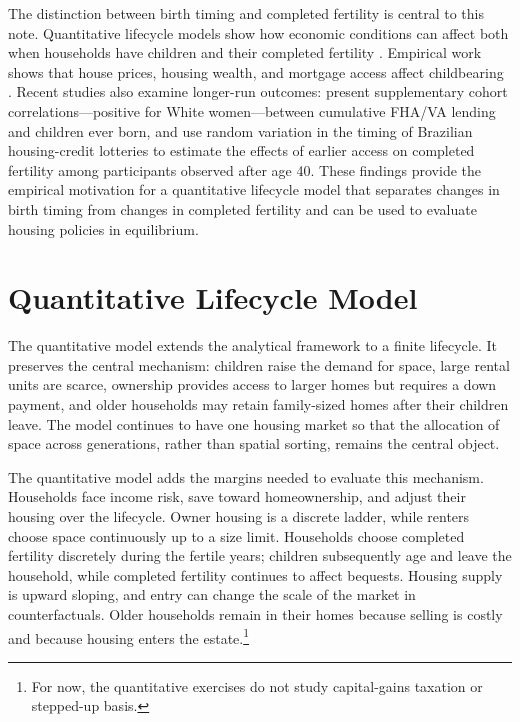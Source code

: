 \documentclass[11pt]{article}
\theoremstyle{definition}
\newcommand{\1}{\mathbf 1}
\begin{document}
The distinction between birth timing and completed fertility is central to
this note. Quantitative lifecycle models show how economic conditions can
affect both when households have children and their completed fertility
\citep{sommerFertilityChoiceLife2016,doepkeBargainingBabiesTheory2019}.
Empirical work shows that house prices, housing wealth, and mortgage access
affect childbearing
\citep{lovenheimFamilyWealthShocks2013,dettlingHousePricesBirth2014,hacamoBabiesMortgageDeregulation2021}.
Recent studies also examine longer-run outcomes: \citet{dettlingKearneyModernMortgage2025}
present supplementary cohort correlations---positive for White women---between
cumulative FHA/VA lending and children ever born, and
\citet{vandoornikFazioRamadoraiSkrastinsHousingFertility2025} use random
variation in the timing of Brazilian housing-credit lotteries to estimate the
effects of earlier access on completed fertility among participants observed
after age 40. These
findings provide the empirical motivation for a quantitative lifecycle model
that separates changes in birth timing from changes in completed fertility and
can be used to evaluate housing policies in equilibrium.



\section{Quantitative Lifecycle Model}
The quantitative model extends the analytical framework to a finite
lifecycle. It preserves the central mechanism: children raise the demand for
space, large rental units are scarce, ownership provides access to larger homes
but requires a down payment, and older households may retain family-sized homes
after their children leave. The model continues to have one housing market so
that the allocation of space across generations, rather than spatial sorting,
remains the central object.

The quantitative model adds the margins needed to evaluate this mechanism.
Households face income risk, save toward homeownership, and adjust their
housing over the lifecycle. Owner housing is a discrete ladder, while renters
choose space continuously up to a size limit. Households choose completed
fertility discretely during the fertile years; children subsequently age and
leave the household, while completed fertility continues to affect bequests.
Housing supply is upward sloping, and entry can change the scale of
the market in counterfactuals. Older households remain in their homes because
selling is costly and because housing enters the estate.\footnote{For now, the
quantitative exercises do not study capital-gains taxation or stepped-up
basis.}
\end{document}
